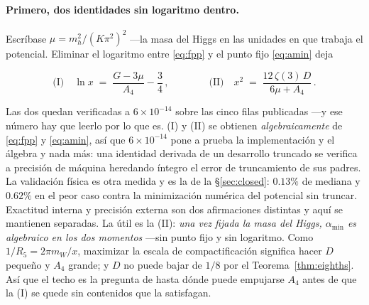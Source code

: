 \documentclass[11pt,a4paper]{article}
\newcommand{\amin}{\alpha_{\min}}
\newenvironment{keyeq}
  {\begin{center}\setlength{\fboxsep}{9pt}\setlength{\fboxrule}{0.8pt}%
   \begin{lrbox}{\keyeqbox}\begin{minipage}{0.88\textwidth}}
  {\end{minipage}\end{lrbox}%
   \fcolorbox{hdrblue!55}{hdrblue!6}{\usebox{\keyeqbox}}\end{center}}
\begin{document}
\paragraph{Primero, dos identidades sin logaritmo dentro.} Escríbase
$\mu = m_h^2/(K\pi^2)^2$ ---la masa del Higgs en las unidades en que trabaja el potencial. Eliminar
el logaritmo entre \eqref{eq:fpp} y el punto fijo \eqref{eq:amin} deja
\begin{keyeq}
\begin{equation}\label{eq:two}
  \text{(I)}\quad \ln x \;=\; \frac{G-3\mu}{A_4}-\frac34\,,
  \qquad\qquad
  \text{(II)}\quad x^2 \;=\; \frac{12\,\zeta(3)\,D}{6\mu+A_4}\,.
\end{equation}
\end{keyeq}
\noindent Las dos quedan verificadas a $6\times10^{-14}$ sobre las cinco filas publicadas ---y ese
número hay que leerlo por lo que es. (I) y (II) se obtienen \emph{algebraicamente} de
\eqref{eq:fpp} y \eqref{eq:amin}, así que $6\times10^{-14}$ pone a prueba la implementación y el
álgebra y nada más: una identidad derivada de un desarrollo truncado se verifica a precisión de máquina heredando
íntegro el error de truncamiento de sus padres. La validación física es otra
medida y es la de la \S\ref{sec:closed}: $0.13\%$ de mediana y $0.62\%$ en el peor caso contra la
minimización numérica del potencial sin truncar. Exactitud interna y precisión externa son dos
afirmaciones distintas y aquí se mantienen separadas. La útil es
la (II): \emph{una vez fijada la masa del Higgs, $\amin$ es algebraico en los dos momentos} ---sin
punto fijo y sin logaritmo. Como $1/R_5=2\pi m_W/x$, maximizar la escala de compactificación
significa hacer $D$ pequeño y $A_4$ grande; y $D$ no puede bajar de $1/8$ por el
Teorema~\ref{thm:eighths}. Así que el techo es la pregunta de hasta dónde puede empujarse $A_4$
antes de que la (I) se quede sin contenidos que la satisfagan.
\end{document}
